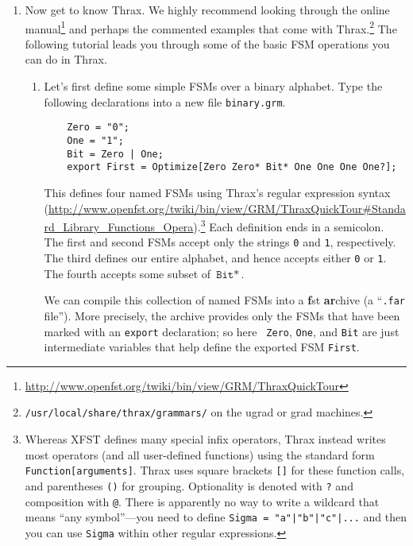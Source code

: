 \documentclass[11pt]{article}
\makeatletter
\newcommand{\atsign}{{\makeatletter @\makeatother}}
\makeatother
\begin{document}
\begin{enumerate}

\item\label{q:binary} Now get to know Thrax.  We highly
  recommend looking through the online
  manual\footnote{\url{http://www.openfst.org/twiki/bin/view/GRM/ThraxQuickTour}}
  and perhaps the commented examples that come with
  Thrax.\footnote{\texttt{/usr/local/share/thrax/grammars/} on the
    ugrad or grad machines.}  The following tutorial leads you through
  some of the basic FSM operations you can do in Thrax.
  \begin{enumerate}
  \item Let's first define some simple FSMs over a binary alphabet. Type the following declarations into a new file \texttt{binary.grm}.
    \begin{center}
	\begin{verbatim}
	Zero = "0";
	One = "1";
	Bit = Zero | One;
	export First = Optimize[Zero Zero* Bit* One One One One?];
	\end{verbatim}
    \end{center}
    This defines four named FSMs using Thrax's regular expression
    syntax
    (\url{http://www.openfst.org/twiki/bin/view/GRM/ThraxQuickTour#Standard_Library_Functions_Opera}).\footnote{Whereas
      XFST defines many special infix operators, Thrax instead
      writes most operators (and all user-defined functions) using
      the standard form \texttt{Function[arguments]}.  Thrax uses
      square brackets \texttt{[]} for these function calls, and
      parentheses \texttt{()} for grouping.  Optionality is
      denoted with \texttt{?} and composition with \texttt{\atsign}.
      There is apparently no way to write a wildcard that means
      ``any symbol''---you need to define \texttt{Sigma =
        "a"|"b"|"c"|...} and then you can use \texttt{Sigma}
      within other regular expressions.} Each definition ends in a
    semicolon.  The first and second FSMs accept only the strings
    \texttt{0} and \texttt{1}, respectively.  The third defines
    our entire alphabet, and hence accepts either \texttt{0} or
    \texttt{1}. The fourth accepts some subset of
    $\texttt{Bit}*$.

    We can compile this collection of named FSMs into a
    \textbf{f}st \textbf{ar}chive (a ``\texttt{.far} file'').
    More precisely, the archive provides only the FSMs that have
    been marked with an {\tt export} declaration; so here {\tt
      Zero}, {\tt One}, and {\tt Bit} are just intermediate
    variables that help define the exported FSM {\tt First}.


\end{enumerate}
\end{enumerate}
\end{document}
